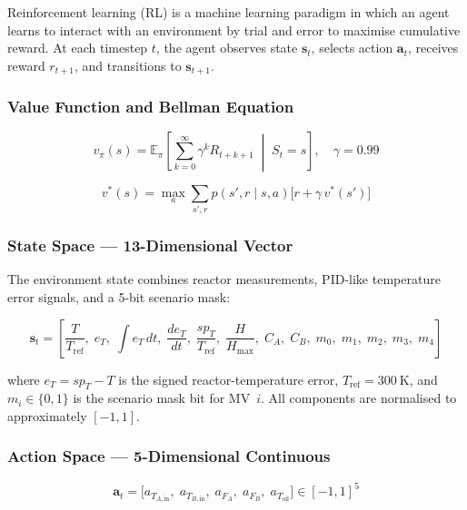 \documentclass[12pt,a4paper]{article}
\begin{document}
Reinforcement learning (RL) is a machine learning paradigm in which an agent
learns to interact with an environment by trial and error to maximise cumulative
reward. At each timestep $t$, the agent observes state $\mathbf{s}_t$, selects
action $\mathbf{a}_t$, receives reward $r_{t+1}$, and transitions to
$\mathbf{s}_{t+1}$.

\subsubsection{Value Function and Bellman Equation}

\begin{equation}
  v_\pi(s) = \mathbb{E}_\pi\!\left[\sum_{k=0}^{\infty}\gamma^k R_{t+k+1}
             \;\middle|\; S_t = s\right],
  \quad \gamma = 0.99
  \label{eq:vpi}
\end{equation}

\begin{equation}
  v^*(s) = \max_a \sum_{s',r}p(s',r\mid s,a)\bigl[r + \gamma\,v^*(s')\bigr]
  \label{eq:bellman}
\end{equation}

\subsubsection{State Space — 13-Dimensional Vector}

The environment state combines reactor measurements, PID-like temperature error
signals, and a 5-bit scenario mask:

\begin{equation}
  \mathbf{s}_t = \left[
    \frac{T}{T_\mathrm{ref}},\;
    e_T,\;
    \int e_T\,dt,\;
    \frac{de_T}{dt},\;
    \frac{sp_T}{T_\mathrm{ref}},\;
    \frac{H}{H_\mathrm{max}},\;
    C_A,\;
    C_B,\;
    m_0,\; m_1,\; m_2,\; m_3,\; m_4
  \right]
  \label{eq:state}
\end{equation}

where $e_T = sp_T - T$ is the signed reactor-temperature error, $T_\mathrm{ref}
= 300\ \mathrm{K}$, and $m_i \in \{0,1\}$ is the scenario mask bit for
MV~$i$. All components are normalised to approximately $[-1,1]$.

\subsubsection{Action Space — 5-Dimensional Continuous}

\begin{equation}
  \mathbf{a}_t = \bigl[a_{T_{A,\mathrm{in}}},\;
                        a_{T_{B,\mathrm{in}}},\;
                        a_{F_A},\;
                        a_{F_B},\;
                        a_{T_\mathrm{oil}}\bigr] \in [-1,1]^5
  \label{eq:action}
\end{equation}
\end{document}
